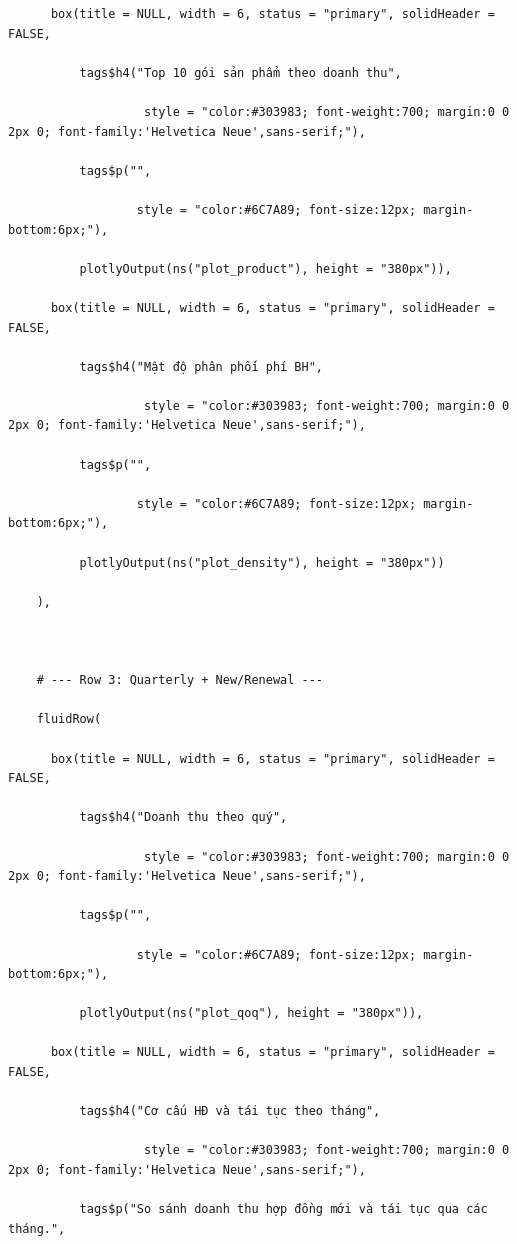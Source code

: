 \documentclass[12pt, a4paper]{article}
\begin{document}
\begin{lstlisting}
      box(title = NULL, width = 6, status = "primary", solidHeader = FALSE,

          tags$h4("Top 10 gói sản phẩm theo doanh thu",

                   style = "color:#303983; font-weight:700; margin:0 0 2px 0; font-family:'Helvetica Neue',sans-serif;"),

          tags$p("",

                  style = "color:#6C7A89; font-size:12px; margin-bottom:6px;"),

          plotlyOutput(ns("plot_product"), height = "380px")),

      box(title = NULL, width = 6, status = "primary", solidHeader = FALSE,

          tags$h4("Mật độ phân phối phí BH",

                   style = "color:#303983; font-weight:700; margin:0 0 2px 0; font-family:'Helvetica Neue',sans-serif;"),

          tags$p("",

                  style = "color:#6C7A89; font-size:12px; margin-bottom:6px;"),

          plotlyOutput(ns("plot_density"), height = "380px"))

    ),



    # --- Row 3: Quarterly + New/Renewal ---

    fluidRow(

      box(title = NULL, width = 6, status = "primary", solidHeader = FALSE,

          tags$h4("Doanh thu theo quý",

                   style = "color:#303983; font-weight:700; margin:0 0 2px 0; font-family:'Helvetica Neue',sans-serif;"),

          tags$p("",

                  style = "color:#6C7A89; font-size:12px; margin-bottom:6px;"),

          plotlyOutput(ns("plot_qoq"), height = "380px")),

      box(title = NULL, width = 6, status = "primary", solidHeader = FALSE,

          tags$h4("Cơ cấu HĐ và tái tục theo tháng",

                   style = "color:#303983; font-weight:700; margin:0 0 2px 0; font-family:'Helvetica Neue',sans-serif;"),

          tags$p("So sánh doanh thu hợp đồng mới và tái tục qua các tháng.",


\end{lstlisting}
\end{document}
